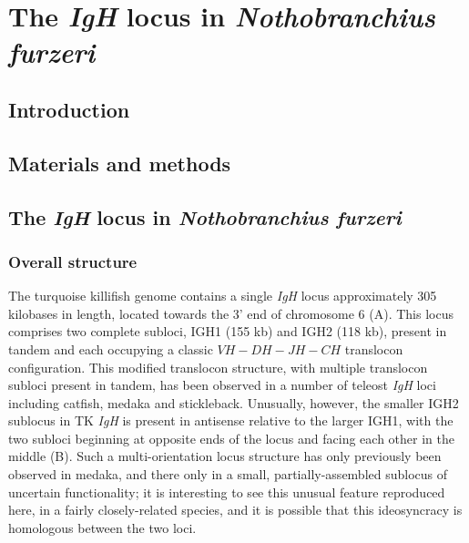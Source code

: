 
\chapter{The \textit{IgH} locus in \textit{Nothobranchius furzeri}}  
\onehalfspacing




\pagebreak


\section{Introduction}

\section{Materials and methods} %

\section{The \textit{IgH} locus in \textit{Nothobranchius furzeri}}

	\subsection{Overall structure}
	
	The turquoise killifish genome contains a single \textit{IgH} locus approximately 305 kilobases in length, located towards the 3' end of chromosome 6 (A).
	This locus comprises two complete subloci, IGH1 (155 kb) and IGH2 (118 kb), present in tandem and each occupying a classic ${VH-DH-JH-CH}$ translocon configuration. This modified translocon structure, with multiple translocon subloci present in tandem, has been observed in a number of teleost \textit{IgH} loci including catfish, medaka and stickleback. Unusually, however, the smaller IGH2 sublocus in TK \textit{IgH} is present in antisense relative to the larger IGH1, with the two subloci beginning at opposite ends of the locus and facing each other in the middle (B). Such a multi-orientation locus structure has only previously been observed in medaka, and there only in a small, partially-assembled sublocus of uncertain functionality; it is interesting to see this unusual feature reproduced here, in a fairly closely-related species, and it is possible that this ideosyncracy is homologous between the two loci. %
	
